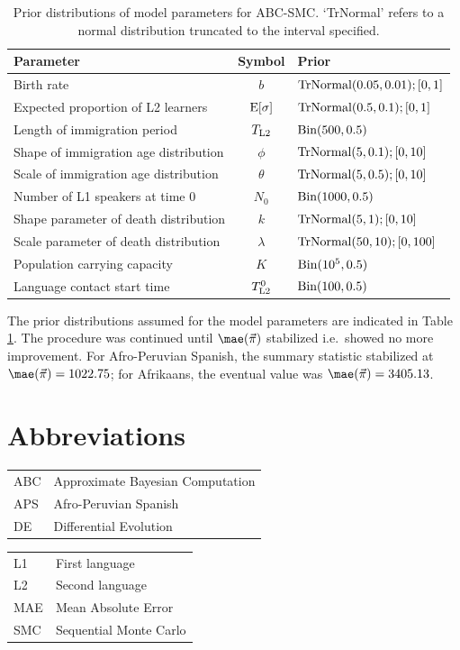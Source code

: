 \begin{table}
\caption{Prior distributions of model parameters for ABC-SMC. `TrNormal' refers to a normal distribution truncated to the interval specified.}\label{tbl:optimizebounds}
\begin{tabular}{lcl}
\toprule
Parameter & Symbol & Prior\\
\midrule
Birth rate & $b$ & $\textnormal{TrNormal} (0.05, 0.01); [0, 1]$\\
Expected proportion of L2 learners & $\textnormal{E}[\sigma]$ & $\textnormal{TrNormal} (0.5, 0.1); [0, 1]$\\
Length of immigration period & $T_\textnormal{L2}$ & $\textnormal{Bin} (500, 0.5)$\\
Shape of immigration age distribution & $\phi$ & $\textnormal{TrNormal} (5, 0.1); [0, 10]$\\
Scale of immigration age distribution & $\theta$ & $\textnormal{TrNormal} (5, 0.5); [0, 10]$\\
Number of L1 speakers at time 0 & $N_0$ & $\textnormal{Bin} (1000, 0.5)$\\
Shape parameter of death distribution & $k$ & $\textnormal{TrNormal} (5, 1); [0, 10]$\\
Scale parameter of death distribution & $\lambda$ & $\textnormal{TrNormal} (50, 10); [0, 100]$\\
Population carrying capacity & $K$ & $\textnormal{Bin} (10^5, 0.5)$\\
Language contact start time & $T_\textnormal{L2}^0$ & $\textnormal{Bin} (100, 0.5)$\\
\bottomrule
\end{tabular}
\end{table}

The prior distributions assumed for the model parameters are indicated
in Table \ref{tbl:optimizebounds}. The procedure was continued until
\(\mae (\vec{\pi})\) stabilized i.e.~showed no more improvement. For
Afro-Peruvian Spanish, the summary statistic stabilized at
\(\mae(\vec{\pi}) = 1022.75\); for Afrikaans, the eventual value was
\(\mae(\vec{\pi}) = 3405.13\).

\section*{Abbreviations}

\begin{tabularx}{.45\textwidth}{lQ}
ABC & Approximate Bayesian Computation \\
APS & Afro-Peruvian Spanish \\
DE & Differential Evolution \\
\end{tabularx}
\begin{tabularx}{.45\textwidth}{lQ}
L1 & First language \\
L2 & Second language \\
MAE & Mean Absolute Error \\
SMC & Sequential Monte Carlo
\end{tabularx}

